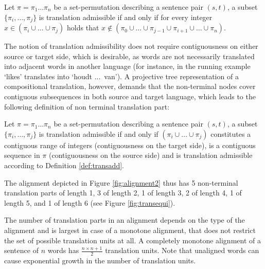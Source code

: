 \begin{definition}\label{def:transadd}
Let $\pi = \pi_1 \ldots \pi_n$ be a set-permutation describing a sentence pair $(s,t)$, a subset $\{\pi_i,\ldots,\pi_j\}$ is translation admissible if and only if for every integer $x \in (\pi_i\cup \ldots \cup\pi_j)$ holds that $x \notin (\pi_0\cup \ldots \cup \pi_{j-1} \cup \pi_{i+1}\cup\ldots\cup \pi_n)$.
\end{definition}

\noindent The notion of translation admissibility does not require contiguousness on either source or target side, which is desirable, as words are not necessarily translated into adjacent words in another language (for instance, in the running example `likes' translates into `houdt ...~van'). A projective tree representation of a compositional translation, however, demands that the non-terminal nodes cover contiguous subsequences in both source and target language, which leads to the following definition of non terminal translation part:

\begin{definition}\label{def:transpart}
Let $\pi = \pi_1 \ldots \pi_n$ be a set-permutation describing a sentence pair $(s,t)$, a subset $\{\pi_i,\ldots,\pi_j\}$ is translation admissible if and only if $(\pi_i\cup \ldots \cup \pi_j)$ constitutes a contiguous range of integers (contiguousness on the target side), is a contiguous sequence in $\pi$ (contiguousness on the source side) and is translation admissible according to Definition \ref{def:transadd}.
\end{definition}

\noindent The alignment depicted in Figure \ref{fig:alignment2} thus has 5 non-terminal translation parts of length 1, 3 of length 2, 1 of length 3, 2 of length 4, 1 of length 5, and 1 of length 6 (see Figure \ref{fig:transequi}).

The number of translation parts in an alignment depends on the type of the alignment and is largest in case of a monotone alignment, that does not restrict the set of possible translation units at all. A completely monotone alignment of a sentence of $n$ words has $\frac{n\times n+1}{2}$ translation units. Note that unaligned words can cause exponential growth in the number of translation units.

